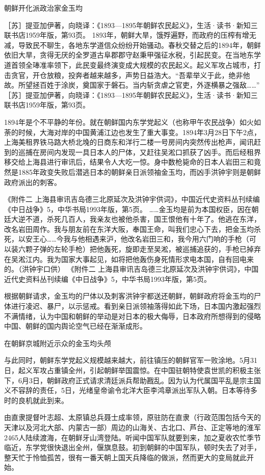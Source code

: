 \documentclass[12pt,UTF8]{ctexbook}
\begin{document}
朝鲜开化派政治家金玉均

［苏］提亚加伊著，向晓译：《1893—1895年朝鲜农民起义》，生活·读书·新知三联书店1959年版，第93页。
1893年，朝鲜大旱，饿殍遍野，而政府的压榨有增无减，导致民不聊生，各地东学道信众纷纷开始骚动。春秋交替之后的1894年，朝鲜依旧大旱，贪得无厌的全罗道古阜郡郡守赵秉甲强征水税，引起民变。在当地东学道首领全琫准率领下，此民变最终演变成大规模的农民起义。起义军攻占城市，打击贪官，开仓放粮，投奔者越来越多，声势日益浩大。“吾辈举义于此，绝非他故。所望拯百姓于涂炭，奠国家于磐石。当内斩贪虐之官吏，外逐横暴之强敌……” ［苏］提亚加伊著，向晓译：《1893—1895年朝鲜农民起义》，生活·读书·新知三联书店1959年版，第93页。

1894年是个不平静的年份。就在朝鲜国内东学党起义（也称甲午农民战争）如火如荼的时候，大海对岸的中国黄浦江边也发生了重大事变。1894年3月28日下午2点，上海美租界铁马路大桥北堍的日商东和洋行二楼一号房间内突然传出枪声，闻讯赶到的巡捕在房间内发现一具日本人的尸体，又赶往吴淞口抓获了凶手。而后经租界移交给上海县进行审讯后，结果令人大吃一惊。身中数枪毙命的日本人岩田三和竟然是1885年政变失败后潜逃日本的朝鲜亲日派领袖金玉均，而凶手洪钟宇则是朝鲜政府派出的刺客。

《附件二 上海县审讯吉岛德三北原延次及洪钟宇供词》，中国近代史资料丛刊续编《中日战争》5，中华书局1993年版，第5页。
……金玉均是前为本国权臣，因在朝廷大逆不道，杀死几百人，我亲友也被他杀害，国王恨他有十年了。他逃在东洋，改名岩田周作。我与朋友前在东洋大阪，奉国王命，叫我们忠心下去，把金玉均杀死，以安王心……今我与他相遇来沪，他改名岩田三和，我今用六门响的手枪（可以装六颗子弹的左轮手枪）把他轰死，旋即走至吴淞，被巡捕追获的，手枪已掉弃在吴淞江内。我为国家大事起见，如将把他轰伤身死情形求电本国，自有回电来的。（洪钟宇口供） 《附件二 上海县审讯吉岛德三北原延次及洪钟宇供词》，中国近代史资料丛刊续编《中日战争》5，中华书局1993年版，第5页。

根据朝鲜请求，金玉均的尸体以及刺客洪钟宇都送还朝鲜，朝鲜政府将金玉均的尸体进行凌迟、暴尸，以示惩戒。看到亲日派领袖落得如此下场，日本国内激起强烈不满情绪，认为中国和朝鲜的举动是对日本的极大侮辱，日本政府所想得到的侵略中国、朝鲜的国内舆论空气已经在渐渐成形。


在朝鲜京城附近示众的金玉均头颅

与此同时，朝鲜东学党起义规模越来越大，前往镇压的朝鲜官军一败涂地。5月31日，起义军攻占重镇全州，引起朝鲜举国震惊。在中国驻朝特使袁世凯的积极主张下，6月3日，朝鲜政府正式请求清廷派兵帮助戡乱。因为认为代属国平乱是宗主国义不容辞的责任，5日，光绪皇帝谕令北洋大臣李鸿章派出军队入朝。日本等待多时的良机就此到来。

由直隶提督叶志超、太原镇总兵聂士成率领，原驻防在直隶（行政范围包括今天的天津以及河北大部、内蒙古一部）周边的山海关、古北口、芦台、正定等地的淮军2465人陆续渡海，在朝鲜牙山湾登陆。听闻中国军队就要到来，加之夏收农忙季节临近，东学党很快退出全州，偃旗息鼓。初到朝鲜的中国军队，顿时失去了对手，整天忙于怜恤孤苦，很有一番天朝上国天兵降临的做派，然而更大的变局就此开始。
\end{document}
